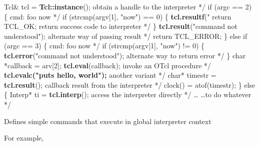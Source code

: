 \documentclass[landscape]{foils}
\begin{document}
\begin{comment}
\item Mention preamble, 
\item call to
\item called from
\end{comment}

\begin{program}
  Tcl& tcl = {\bf{}Tcl::instance}();        \* obtain a handle to the interpreter */
  if (argc == 2) \{                   \* cmd: {\rm{}foo now} */
    if (strcmp(argv[1], "now") == 0) \{
      {\bf{}tcl.resultf}("%
      return TCL_OK;                 \* return success code to interpreter */
    \}
    {\bf{}tcl.result}("command not understood"); \* alternate way of passing result */
    return TCL_ERROR;
  \} else if (argc == 3) \{            \* cmd: {\rm{}foo now } */
    if (strcmp(argv[1], "now") != 0) \{
      {\bf{}tcl.error}("command not understood");  \* alternate way to return error */
    \}
    char *callback = arv[2];
    {\bf{}tcl.eval}(callback);                \* invoke an OTcl procedure */
    {\bf{}tcl.evalc("puts {hello, world}");}   \* another variant */
    char* timestr = {\bf{}tcl.result}();   \* callback result from the interpreter */
    clock() = atof(timestr);
  \} else \{
    Interp* ti = {\bf{}tcl.interp}();  \* access the interpreter directly */
    \ldots                                 \* \ldots to do whatever */
\end{program}

\begin{comment}
\item obtain the reference
\item invoke OTcl procedures, one shown, others...
\item result handling, all three forms shown
\item error handling, differences from returning TCL\_ERROR
\item Direct access
\end{comment}

Defines simple commands that execute in global interpreter context

For example, 

\begin{comment}
\item 1. define the class, derived from TclCommand.
\item 2. constructor invokes parent constst. w. name of command as argument
\item 3. command function and arguments to do the work
\item 4. declare instance.  default instance for ns-version and others
  are declared in init\_misc(), in misc.cc, and are called by tclAppInit().
\end{comment}
\end{document}
